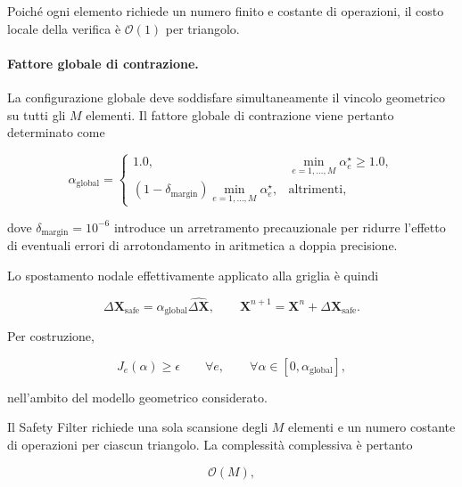 Poiché ogni elemento richiede un numero finito e costante di operazioni, il costo locale della verifica è $\mathcal{O}(1)$ per triangolo.

\paragraph{Fattore globale di contrazione.}

La configurazione globale deve soddisfare simultaneamente il vincolo geometrico su tutti gli $M$ elementi. Il fattore globale di contrazione viene pertanto determinato come

\begin{equation}
\alpha_{\mathrm{global}}
=
\begin{cases}
1.0,
&
\displaystyle
\min_{e=1,\ldots,M}\alpha_e^\star\geq1.0,
\\[8pt]
(1-\delta_{\mathrm{margin}})
\displaystyle
\min_{e=1,\ldots,M}\alpha_e^\star,
&
\text{altrimenti},
\end{cases}
\label{eq:global_alpha}
\end{equation}

dove $\delta_{\mathrm{margin}}=10^{-6}$ introduce un arretramento precauzionale per ridurre l'effetto di eventuali errori di arrotondamento in aritmetica a doppia precisione.

Lo spostamento nodale effettivamente applicato alla griglia è quindi

\begin{equation}
\Delta\mathbf{X}_{\mathrm{safe}}
=
\alpha_{\mathrm{global}}
\widehat{\Delta\mathbf{X}},
\qquad
\mathbf{X}^{n+1}
=
\mathbf{X}^{n}
+
\Delta\mathbf{X}_{\mathrm{safe}}.
\label{eq:safe_displacement}
\end{equation}

Per costruzione,

\begin{equation}
J_e(\alpha)\geq\epsilon
\qquad
\forall e,
\qquad
\forall\alpha\in
[0,\alpha_{\mathrm{global}}],
\label{eq:safety_guarantee}
\end{equation}

nell'ambito del modello geometrico considerato.

Il Safety Filter richiede una sola scansione degli $M$ elementi e un numero costante di operazioni per ciascun triangolo. La complessità complessiva è pertanto

\begin{equation}
\mathcal{O}(M),
\label{eq:safety_complexity}
\end{equation}

